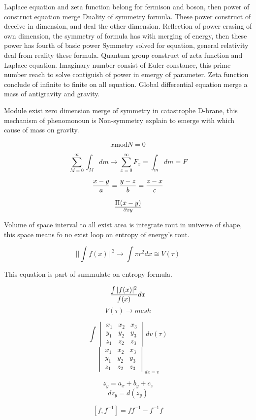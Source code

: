 \documentclass{jsarticle}
\begin{document}
  Laplace equation and zeta function belong for fermison and boson, then power of construct equation merge
Duality of symmetry formula. These power construct of deceive in dimension, and deal the other dimension. Reflection
of power erasing of own dimension, the symmetry of formula has with merging of energy, then these power has fourth
of basic power Symmetry solved for equation, general relativity deal from reality these formula. Quantum group
construct of zeta function and Laplace equation. Imaginary number consist of Euler constance, this prime number
reach to solve contiguish of power in emergy of parameter. Zeta function conclude of infinite to finite on all
equation. Global differential equation merge a mass of antigravity and gravity.

  Module exist zero dimension merge of symmetry in catastrophe D-brane, this mechanism of phenomonoun
is Non-symmetry explain to emerge with which cause of mass on gravity.

$$x \mathrm{mod} N = 0 $$

$$ \sum^{\infty}_{M=0} \int_M dm \to \sum^{\infty}_{x=0} F_x = \int_m dm = F $$

$$ {x - y \over a } = {y - z \over b} = {z - x \over c} $$

$$ \Pi(x - y) \over \partial xy $$

  Volume of space interval to all exist area is integrate rout in universe of shape, this space means fo
no exist loop on entropy of energy's rout.

$$ || \int f(x) ||^2 \to \int \pi r^2 dx \cong V(\tau) $$

 This equation is part of summulate on entropy formula.

 $$ {\int |f(x)|^2 \over f(x)} dx $$
$$V(\tau) \to mesh $$

 $$ \int \begin{vmatrix} x_1 & x_2 & x_3 \\
    y_1 & y_2 & y_3 \\
    z_1 & z_2 & z_3 \end{vmatrix} dv({\tau}) $$
 $$ \begin{vmatrix} x_1 & x_2 & x_3 \\
    y_1 & y_2 & y_3 \\
    z_1 & z_2 & z_3 \end{vmatrix}_{dx=v}  $$


   $$ z_y = a_x + b_y + c_z $$
$$ dz_y = d(z_y) $$

$$ [f, f^{-1}] = ff^{-1} - f^{-1}f $$
\end{document}
